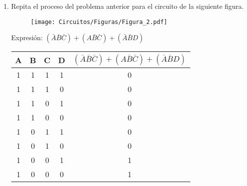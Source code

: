 \documentclass[a4paper, 12pt]{article}
\newcommand{\Aspace}{0.2cm}
\begin{document}
\begin{enumerate}
        \newpage
        \item Repita el proceso del problema anterior para el circuito de la siguiente figura. \par
        \begin{figure}[!ht]
            \centering
            \texttt{[image: Circuitos/Figuras/Figura\_2.pdf]}
        \end{figure}
            \vspace{\Aspace} \par
            { \color{azul} Expresión: $(\bar{A} \bar{B} \bar{C}) + (A \bar{B} \bar{C}) + (\bar{A} \bar{B} D)$ \par \vspace{0.5cm}
                \begin{tabular}{c|c|c|c|c}
                    \textbf{A}  &   \textbf{B}  &   \textbf{C}  &   \textbf{D}  &   $(\bar{A} \bar{B} \bar{C}) + (A \bar{B} \bar{C}) + (\bar{A} \bar{B} D)$     \\ \hline
                    1           &   1           &   1           &   1           &   0                                                                           \\
                    1           &   1           &   1           &   0           &   0                                                                           \\
                    1           &   1           &   0           &   1           &   0                                                                           \\
                    1           &   1           &   0           &   0           &   0                                                                           \\
                    1           &   0           &   1           &   1           &   0                                                                           \\
                    1           &   0           &   1           &   0           &   0                                                                           \\
                    1           &   0           &   0           &   1           &   1                                                                           \\
                    1           &   0           &   0           &   0           &   1                                                                           \\

\end{tabular}}
\end{enumerate}
\end{document}
